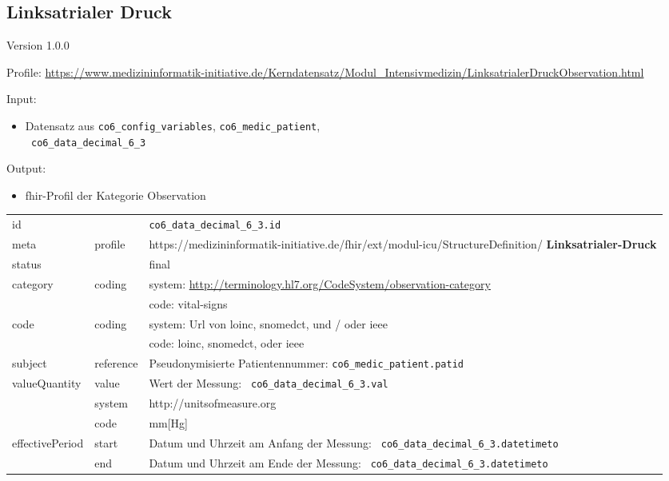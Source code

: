 \subsection{
Linksatrialer Druck} 
\noindent Version 1.0.0

\noindent Profile: \url{https://www.medizininformatik-initiative.de/Kerndatensatz/Modul_Intensivmedizin/LinksatrialerDruckObservation.html}

\noindent Input:
\begin{itemize}
	\item Datensatz aus \texttt{co6\_config\_variables}, \texttt{co6\_medic\_patient}, \\ \texttt{
co6\_data\_decimal\_6\_3}
\end{itemize}
Output:
\begin{itemize}
        \item \ac{fhir}-Profil der Kategorie \glqq Observation\grqq{}
\end{itemize}
\begin{longtable}{|l|l|p{7.5cm}|}
        \hline
        \rowcolor{lightgray} \multicolumn{3}{|l|}{Data Mapping (inhaltlich)} \\ \hline
        id &  & \texttt{co6\_data\_decimal\_6\_3.id} \\ \hline
	meta & profile & https://medizininformatik-initiative.de/fhir/ext/modul-icu/StructureDefinition/\textbf{
Linksatrialer-Druck} \\ \hline 
	status &  & final  \\ \hline 
	category & coding & system: \url{http://terminology.hl7.org/CodeSystem/observation-category} \\
\cline{3-3}
	& & code: vital-signs \\ \hline
	code & coding & system: Url von \ac{loinc}, \ac{snomedct}, und / oder \ac{ieee} \\ 
	\cline{3-3} 
	 &  & code: \ac{loinc}, \ac{snomedct}, oder \ac{ieee} \\ \hline
	subject & reference & Pseudonymisierte Patientennummer: \texttt{co6\_medic\_patient.patid} \\ \hline
	valueQuantity & value & Wert der Messung: \texttt{
co6\_data\_decimal\_6\_3.val} \\
        \cline{2-3}
         & system & http://unitsofmeasure.org \\
         \cline{2-3}
         & code & mm[Hg] \\ \hline
    effectivePeriod & start & Datum und Uhrzeit am Anfang der Messung: \texttt{
co6\_data\_decimal\_6\_3.datetimeto} \\
    \cline{2-3}
     & end & Datum und Uhrzeit am Ende der Messung: \texttt{
co6\_data\_decimal\_6\_3.datetimeto} \\ \hline
\end{longtable}


